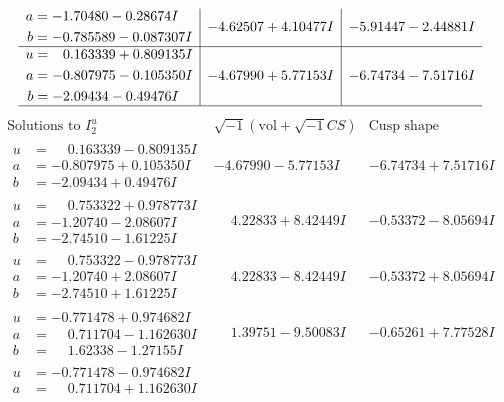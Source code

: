 \documentclass[1p]{elsarticle_modified}
\theoremstyle{definition}
\newcommand{\I}{\sqrt{-1}}
\begin{document}
$$\begin{array}{c|c|c}
\begin{aligned}
a &= -1.70480 - 0.28674 I \\
b &= -0.785589 - 0.087307 I\end{aligned}
 & -4.62507 + 4.10477 I & -5.91447 - 2.44881 I \\ \hline\begin{aligned}
u &= \phantom{-}0.163339 + 0.809135 I \\
a &= -0.807975 - 0.105350 I \\
b &= -2.09434 - 0.49476 I\end{aligned}
 & -4.67990 + 5.77153 I & -6.74734 - 7.51716 I\\
 \hline 
 \end{array}$$\newpage$$\begin{array}{c|c|c}  
\text{Solutions to }I^u_{2}& \I (\text{vol} + \sqrt{-1}CS) & \text{Cusp shape}\\
 \hline 
\begin{aligned}
u &= \phantom{-}0.163339 - 0.809135 I \\
a &= -0.807975 + 0.105350 I \\
b &= -2.09434 + 0.49476 I\end{aligned}
 & -4.67990 - 5.77153 I & -6.74734 + 7.51716 I \\ \hline\begin{aligned}
u &= \phantom{-}0.753322 + 0.978773 I \\
a &= -1.20740 - 2.08607 I \\
b &= -2.74510 - 1.61225 I\end{aligned}
 & \phantom{-}4.22833 + 8.42449 I & -0.53372 - 8.05694 I \\ \hline\begin{aligned}
u &= \phantom{-}0.753322 - 0.978773 I \\
a &= -1.20740 + 2.08607 I \\
b &= -2.74510 + 1.61225 I\end{aligned}
 & \phantom{-}4.22833 - 8.42449 I & -0.53372 + 8.05694 I \\ \hline\begin{aligned}
u &= -0.771478 + 0.974682 I \\
a &= \phantom{-}0.711704 - 1.162630 I \\
b &= \phantom{-}1.62338 - 1.27155 I\end{aligned}
 & \phantom{-}1.39751 - 9.50083 I & -0.65261 + 7.77528 I \\ \hline\begin{aligned}
u &= -0.771478 - 0.974682 I \\
a &= \phantom{-}0.711704 + 1.162630 I \\

\end{aligned}
\end{array}$$
\end{document}
